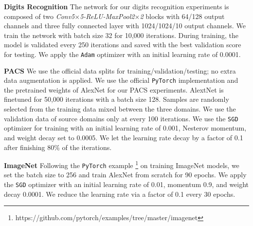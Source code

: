 \documentclass{article} \usepackage{iclr2021_conference,times}
\begin{document}
\textbf{Digits Recognition} The network for our digits recognition experiments is composed of two \emph{Conv5$\times$5-ReLU-MaxPool2$\times$2} blocks with 64/128 output channels and three fully connected layer with 1024/1024/10 output channels. We train the network with batch size 32 for 10,000 iterations. During training, the model is validated every 250 iterations and saved with the best validation score for testing. We apply the \texttt{Adam} optimizer with an initial learning rate of 0.0001.   

\textbf{PACS} We use the official data splits for training/validation/testing; no extra data augmentation is applied. We use the official \texttt{PyTorch} implementation and the pretrained weights of AlexNet for our PACS experiments. AlextNet is finetuned for 50,000 iterations with a batch size 128. Samples are randomly selected from the training data mixed between the three domains. We use the validation data of  source domains only at every 100 iterations. We use the \texttt{SGD} optimizer for training with an initial learning rate of 0.001, Nesterov momentum, and weight decay set to 0.0005. We let the learning rate decay by a factor of 0.1 after finishing 80\% of the iterations.

\textbf{ImageNet} Following the \texttt{PyTorch} example \footnote{https://github.com/pytorch/examples/tree/master/imagenet} on training ImageNet models, we set the batch size to 256 and train AlexNet from scratch for 90 epochs. We apply the \texttt{SGD} optimizer with an initial learning rate of 0.01, momentum 0.9, and weight decay 0.0001. We reduce the learning rate via a factor of 0.1 every 30 epochs.
\end{document}

